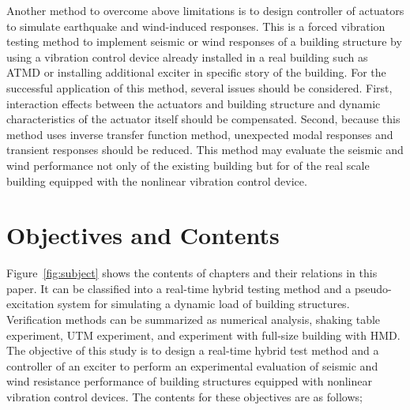 Another method to overcome above limitations is to design controller of actuators to simulate earthquake and wind-induced responses. This is a forced vibration testing method to implement seismic or wind responses of a building structure by using a vibration control device already installed in a real building such as ATMD or installing additional exciter in specific story of the building. For the successful application of this method, several issues should be considered. First, interaction effects between the actuators and building structure and dynamic characteristics of the actuator itself should be compensated. Second, because this method uses inverse transfer function method, unexpected modal responses and transient responses should be reduced. This method may evaluate the seismic and wind performance not only of the existing building but for of the real scale building equipped with the nonlinear vibration control device.


\section{Objectives and Contents}
Figure~\ref{fig:subject} shows the contents of chapters and their relations in this paper. It can be classified into a real-time hybrid testing method and a pseudo-excitation system for simulating a dynamic load of building structures. Verification methods can be summarized as numerical analysis, shaking table experiment, UTM experiment, and experiment with full-size building with HMD. The objective of this study is to design a real-time hybrid test method and a controller of an exciter to perform an experimental evaluation of seismic and wind resistance performance of building structures equipped with nonlinear vibration control devices. The contents for these objectives are as follows;

